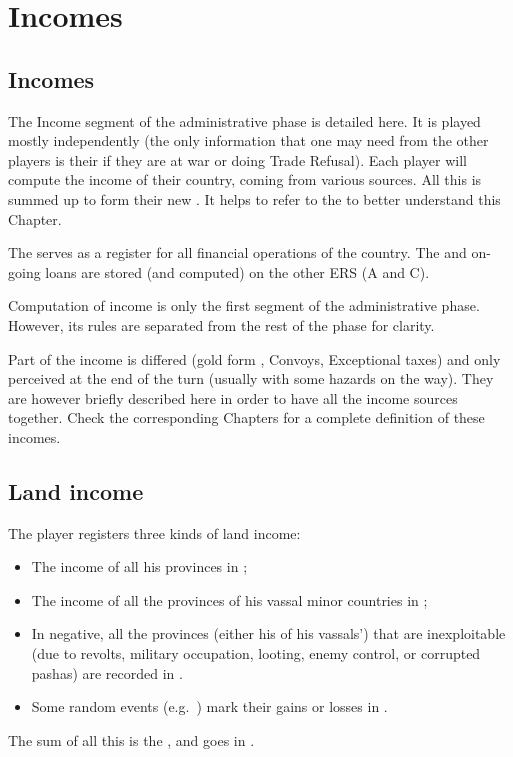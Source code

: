 \chapter{Incomes}\label{chapter:Incomes}
\section{Incomes}
\aparag[Overview]
The Income segment of the administrative phase is detailed here. It is
played mostly independently (the only information that one may need from
the other players is their  if they are at war
or doing Trade Refusal). Each player will compute the income of their
country, coming from various sources.%
All this is summed up to form their new \RT. It helps to refer to the
 to better understand this Chapter.

The  serves as a register for all
financial operations of the country. The \RT and on-going loans are
stored (and computed) on the other ERS (A and C).

Computation of income is only the first segment of the administrative
phase. However, its rules are separated from the rest of the phase for
clarity.

Part of the income is differed (gold form \ROTW, Convoys, Exceptional
taxes) and only perceived at the end of the turn (usually with some
hazards on the way). They are however briefly described here in order to
have all the income sources together. Check the corresponding Chapters
for a complete definition of these incomes.

\section{Land income}\label{chIncomes:LandIncome}
\aparag The player registers three kinds of land income:
\begin{itemize}
\item The income of all his provinces in ;
\item The income of all the provinces of his vassal minor countries in
  ;
\item In negative, all the provinces (either his of his vassals') that
  are inexploitable (due to revolts, military occupation, looting, enemy
  control, or corrupted pashas) are recorded in
  .
\item Some random events (e.g.~) mark their
gains or losses in .
\end{itemize}
\bparag The sum of all this is the , and goes in
.

